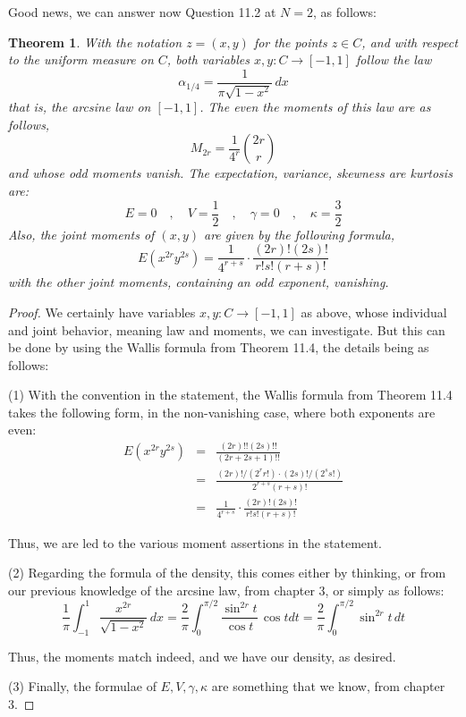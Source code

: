 \documentclass[12pt]{amsbook}
\newtheorem{theorem}{Theorem}[chapter]
\begin{document}
Good news, we can answer now Question 11.2 at $N=2$, as follows:


\begin{theorem}
With the notation $z=(x,y)$ for the points $z\in C$, and with respect to the uniform measure on $C$, both variables $x,y:C\to[-1,1]$ follow the law
$$\alpha_{1/4}=\frac{1}{\pi\sqrt{1-x^2}}\,dx$$
that is, the arcsine law on $[-1,1]$. The even the moments of this law are as follows,
$$M_{2r}=\frac{1}{4^r}\binom{2r}{r}$$
and whose odd moments vanish. The expectation, variance, skewness are kurtosis are:
$$E=0\quad,\quad V=\frac{1}{2}\quad,\quad\gamma=0\quad,\quad\kappa=\frac{3}{2}$$
Also, the joint moments of $(x,y)$ are given by the following formula,
$$E(x^{2r}y^{2s})=\frac{1}{4^{r+s}}\cdot\frac{(2r)!(2s)!}{r!s!(r+s)!}$$
with the other joint moments, containing an odd exponent, vanishing.
\end{theorem}

\begin{proof}
We certainly have variables $x,y:C\to[-1,1]$ as above, whose individual and joint behavior, meaning law and moments, we can investigate. But this can be done by using the Wallis formula from Theorem 11.4, the details being as follows:

\medskip

(1) With the convention in the statement, the Wallis formula from Theorem 11.4 takes the following form, in the non-vanishing case, where both exponents are even:
\begin{eqnarray*}
E(x^{2r}y^{2s})
&=&\frac{(2r)!!(2s)!!}{(2r+2s+1)!!}\\
&=&\frac{(2r)!/(2^rr!)\cdot (2s)!/(2^ss!)}{2^{r+s}(r+s)!}\\
&=&\frac{1}{4^{r+s}}\cdot\frac{(2r)!(2s)!}{r!s!(r+s)!}
\end{eqnarray*}

Thus, we are led to the various moment assertions in the statement. 

\medskip

(2) Regarding the formula of the density, this comes either by thinking, or from our previous knowledge of the arcsine law, from chapter 3, or simply as follows:
$$\frac{1}{\pi}\int_{-1}^1\frac{x^{2r}}{\sqrt{1-x^2}}\,dx=\frac{2}{\pi}\int_0^{\pi/2}\frac{\sin^{2r}t}{\cos t}\,\cos tdt=\frac{2}{\pi}\int_0^{\pi/2}\sin^{2r}t\,dt$$

Thus, the moments match indeed, and we have our density, as desired.

\medskip

(3) Finally, the formulae of $E,V,\gamma,\kappa$ are something that we know, from chapter 3.
\end{proof}
\end{document}
